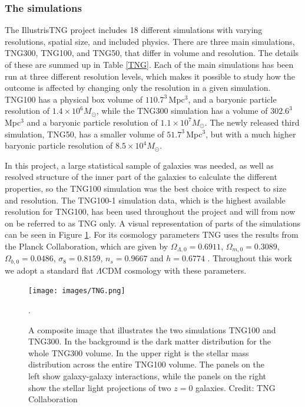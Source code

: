 \subsubsection{The simulations}
The IllustrisTNG project includes 18 different simulations with varying resolutions, spatial size, and included physics. There are three main simulations, TNG300, TNG100, and TNG50, that differ in volume and resolution. The details of these are summed up in Table \ref{TNG}. Each of the main simulations has been run at three different resolution levels, which makes it possible to study how the outcome is affected by changing only the resolution in a given simulation. TNG100 has a physical box volume of $110.7^3 \, $Mpc$^3$, and a baryonic particle resolution of $1.4 \times 10^6 M_{\odot}$, while the TNG300 simulation has a volume of $302.6^3 \, $Mpc$^3$ and a baryonic particle resolution of $1.1 \times 10^7 M_{\odot}$. The newly released third simulation, TNG50, has a smaller volume of $51.7^3 \, $Mpc$^3$, but with a much higher baryonic particle resolution of $8.5 \times 10^4 M_{\odot}$. 

In this project, a large statistical sample of galaxies was needed, as well as resolved structure of the inner part of the galaxies to calculate the different properties, so the TNG100 simulation was the best choice with respect to size and resolution. The TNG100-1 simulation data, which is the highest available resolution for TNG100, has been used throughout the project and will from now on be referred to as TNG only. A visual representation of parts of the simulations can be seen in Figure \ref{tng_illustration}. For its cosmology parameters TNG uses the results from the Planck Collaboration, which are given by $\Omega_{\Lambda,0} = 0.6911$, $\Omega_{m,0}=0.3089$, $\Omega_{b,0}=0.0486$, $\sigma_8=0.8159$, $n_s=0.9667$ and $h = 0.6774$ \parencite{Planck2016}. Throughout this work we adopt a standard flat $\Lambda$CDM cosmology with these parameters.

\begin{figure}
    \centering
    \texttt{[image: images/TNG.png]}
    \caption{A composite image that illustrates the two simulations TNG100 and TNG300. In the background is the dark matter distribution for the whole TNG300 volume. In the upper right is the stellar mass distribution across the entire TNG100 volume. The panels on the left show galaxy-galaxy interactions, while the panels on the right show the stellar light projections of two $z=0$ galaxies. Credit: TNG Collaboration}.
    \label{tng_illustration}
\end{figure}

